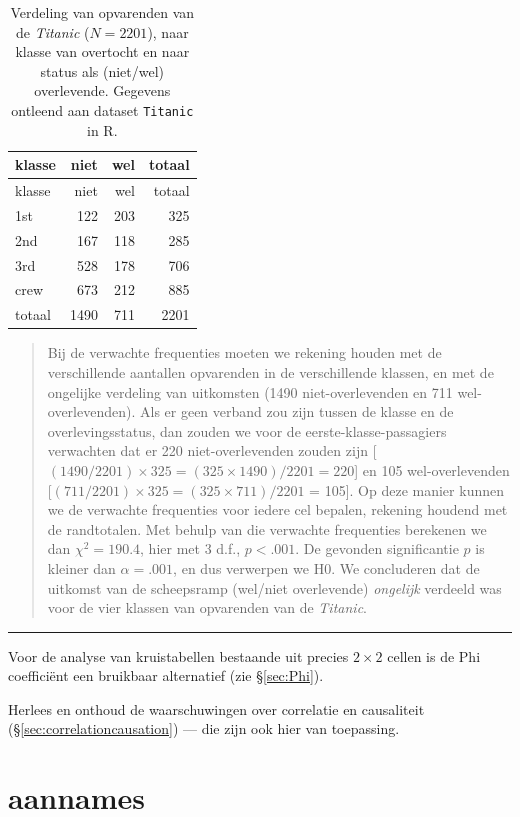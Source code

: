\documentclass[
]{book}
\begin{document}
\begin{longtable}[]{@{}lrrr@{}}
\caption{\label{tab:titanic} Verdeling van opvarenden van de \emph{Titanic} (\(N=2201\)), naar klasse van overtocht en naar status als (niet/wel) overlevende. Gegevens ontleend aan dataset \texttt{Titanic} in R.}\tabularnewline
\toprule
klasse & niet & wel & totaal\tabularnewline
\midrule
\endfirsthead
\toprule
klasse & niet & wel & totaal\tabularnewline
\midrule
\endhead
1st & 122 & 203 & 325\tabularnewline
2nd & 167 & 118 & 285\tabularnewline
3rd & 528 & 178 & 706\tabularnewline
crew & 673 & 212 & 885\tabularnewline
totaal & 1490 & 711 & 2201\tabularnewline
\bottomrule
\end{longtable}

\begin{quote}
Bij de verwachte frequenties moeten we rekening houden met de
verschillende aantallen opvarenden in de verschillende klassen, en met
de ongelijke verdeling van uitkomsten (1490 niet-overlevenden en 711
wel-overlevenden). Als er geen verband zou zijn tussen de klasse en de
overlevingsstatus, dan zouden we voor de eerste-klasse-passagiers
verwachten dat er 220 niet-overlevenden zouden zijn
{[}\((1490/2201) \times 325 = (325 \times 1490) / 2201 = 220\){]} en 105
wel-overlevenden {[}\((711/2201) \times 325 = (325 \times 711) / 2201\) =
105{]}. Op deze manier kunnen we de verwachte frequenties voor iedere cel
bepalen, rekening houdend met de randtotalen. Met behulp van die
verwachte frequenties berekenen we dan \(\chi^2=190.4\), hier met 3 d.f.,
\(p<.001\). De gevonden significantie \(p\) is kleiner dan \(\alpha=.001\), en
dus verwerpen we H0. We concluderen dat de uitkomst van de scheepsramp
(wel/niet overlevende) \emph{ongelijk} verdeeld was voor de vier klassen van
opvarenden van de \emph{Titanic}.
\end{quote}

\begin{center}\rule{0.5\linewidth}{0.5pt}\end{center}

Voor de analyse van kruistabellen bestaande uit precies \(2\times2\)
cellen is de Phi coefficiënt een bruikbaar alternatief (zie
§\ref{sec:Phi}).

Herlees en onthoud de waarschuwingen over correlatie en causaliteit (§\ref{sec:correlationcausation})
--- die zijn ook hier van toepassing.

\hypertarget{sec:chi2toets-aannames}{%
\section{aannames}\label{sec:chi2toets-aannames}}
\end{document}
